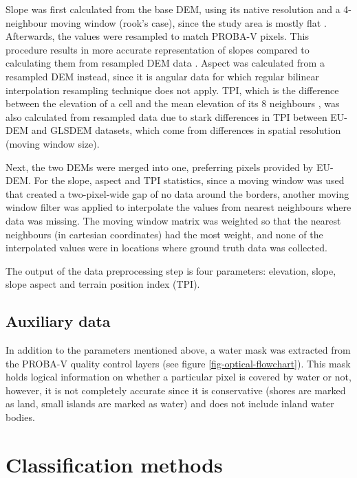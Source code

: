 \documentclass[a4paper,12pt]{scrbook}
\begin{document}
Slope was first calculated from the base DEM, using its native resolution and a 4-neighbour moving window (rook's case), since the study area is mostly flat \citep{jones1998dem}. Afterwards, the values were resampled to match PROBA-V pixels. This procedure results in more accurate representation of slopes compared to calculating them from resampled DEM data \citep{grohmann2015demresampling, wu2008demresampling}. Aspect was calculated from a resampled DEM instead, since it is angular data for which regular bilinear interpolation resampling technique does not apply. TPI, which is the difference between the elevation of a cell and the mean elevation of its 8 neighbours \citep{weiss2001topographic, wilson2007terrain}, was also calculated from resampled data due to stark differences in TPI between EU-DEM and GLSDEM datasets, which come from differences in spatial resolution (moving window size).

Next, the two DEMs were merged into one, preferring pixels provided by EU-DEM. For the slope, aspect and TPI statistics, since a moving window was used that created a two-pixel-wide gap of no data around the borders, another moving window filter was applied to interpolate the values from nearest neighbours where data was missing. The moving window matrix was weighted so that the nearest neighbours (in cartesian coordinates) had the most weight, and none of the interpolated values were in locations where ground truth data was collected.

The output of the data preprocessing step is four parameters: elevation, slope, slope aspect and terrain position index (TPI).

\subsection{Auxiliary data}

In addition to the parameters mentioned above, a water mask was extracted from the PROBA-V quality control layers (see figure \ref{fig-optical-flowchart}). This mask holds logical information on whether a particular pixel is covered by water or not, however, it is not completely accurate since it is conservative (shores are marked as land, small islands are marked as water) and does not include inland water bodies.

\section{Classification methods}
\end{document}

